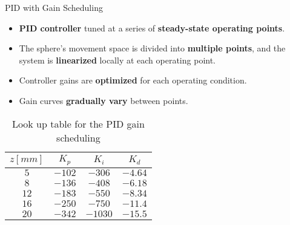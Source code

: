 \begin{frame}{PID with Gain Scheduling}

    \begin{itemize}
        \item \textbf{PID controller} tuned at a series of \textbf{steady-state operating points}.
        \item The sphere's movement space is divided into \textbf{multiple points}, and the system is \textbf{linearized} locally at each operating point.
        \item Controller gains are \textbf{optimized} for each operating condition.
        \item Gain curves \textbf{gradually vary} between points.
    \end{itemize}

    \begin{table}[H]
        \centering
        \begin{tabular}{|c|c|c|c|}
            \hline
            $z [mm]$ & $K_p$  & $K_i$   & $K_d$   \\
            \hline
            $5$      & $-102$ & $-306$  & $-4.64$ \\
            $8$      & $-136$ & $-408$  & $-6.18$ \\
            $12$     & $-183$ & $-550$  & $-8.34$ \\
            $16$     & $-250$ & $-750$  & $-11.4$ \\
            $20$     & $-342$ & $-1030$ & $-15.5$ \\
            \hline
        \end{tabular}
        \caption{Look up table for the PID gain scheduling}
        \label{tab:pid_gain_scheduling_gains}
    \end{table}
\end{frame}



